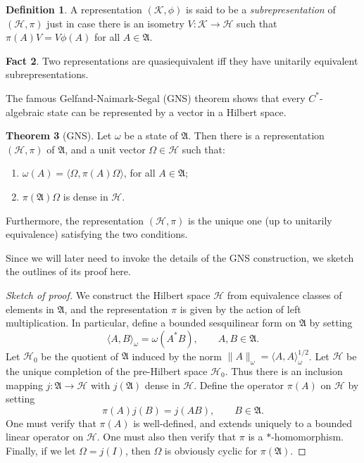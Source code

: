 \documentclass[12pt]{article}
\newcommand{\alg}[1]{\mathfrak{#1}}
\newcommand{\norm}[1]{\| #1\|}
\theoremstyle{definition}
\newtheorem{thm}{Theorem}[section]
\newtheorem{fact}[thm]{Fact}
\theoremstyle{definition}
\newtheorem{defn}[thm]{Definition}
\theoremstyle{remark}
\def\2#1{{\mathcal #1}}
\def\al#1{{\mathfrak #1}}
\def\om{\omega} \def\Om{\Omega} \def\dd{\partial} \def\D{\Delta}
\begin{document}
\begin{defn} A representation $(\2K ,\phi )$ is said to be a
  \emph{subrepresentation} of $(\2H ,\pi )$ just in case there is an
  isometry $V:\2K \to \2H$ such that $\pi (A)V=V\phi (A)$ for all
  $A\in \al A$.
\end{defn}

\begin{fact} Two representations are quasiequivalent iff they have
  unitarily equivalent subrepresentations.  \end{fact}

The famous Gelfand-Naimark-Segal (GNS) theorem shows that every
$C^*$-algebraic state can be represented by a vector in a Hilbert
space.

\begin{thm}[GNS] Let $\om$ be a state of $\alg{A}$.  Then there is a
  representation $(\2H ,\pi )$ of $\alg{A}$, and a unit vector $\Om
  \in \2H$ such that:
  \begin{enumerate}
  \item $\om (A)=\langle \Om ,\pi (A)\Om \rangle$, for all $A\in
    \alg{A}$;
  \item $\pi (\alg{A})\Om$ is dense in $\2H$.
  \end{enumerate}
  Furthermore, the representation $(\2H ,\pi )$ is the unique one (up
  to unitarily equivalence) satisfying the two conditions.  \label{gns}
\end{thm}

Since we will later need to invoke the details of the GNS
construction, we sketch the outlines of its proof here.

\begin{proof}[Sketch of proof] We construct the Hilbert space $\2H$
  from equivalence classes of elements in $\al A$, and the
  representation $\pi$ is given by the action of left multiplication.
  In particular, define a bounded sesquilinear form on $\al A$ by
  setting
$$ \langle A,B\rangle _\om = \om (A^*B ),\qquad A,B\in \al A .$$
Let $\2H _0$ be the quotient of $\al A$ induced by the norm
$\norm{A}_{\om}=\langle A,A\rangle _{\om}^{1/2}$.  Let $\2H$ be the
unique completion of the pre-Hilbert space $\2H _0$.  Thus there is an
inclusion mapping $j:\al A\to \2H$ with $j(\al A)$ dense in $\2H$.
Define the operator $\pi (A)$ on $\2H$ by setting
$$ \pi (A)j(B) = j(AB) ,\qquad B\in \al A .$$
One must verify that $\pi (A)$ is well-defined, and extends uniquely
to a bounded linear operator on $\2H$.  One must also then verify that
$\pi$ is a $*$-homomorphism.  Finally, if we let $\Om =j(I)$, then
$\Om$ is obviously cyclic for $\pi (\alg{A})$.
\end{proof}
\end{document}
